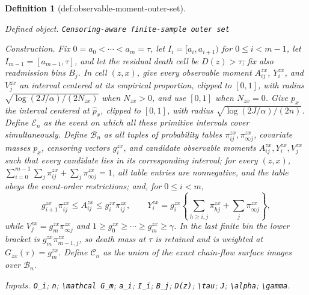 \documentclass{article}
\newtheorem{definition}{Definition}
\begin{document}
\begin{definition}[def:observable-moment-outer-set]\label{def:observable-moment-outer-set}
\par\smallskip\noindent\emph{Defined object.} \texttt{Censoring-\allowbreak{}aware finite-\allowbreak{}sample outer set}
\par\smallskip\noindent\emph{Construction.} Fix \(0=a_0<\cdots<a_m=\tau\), let \(I_i=[a_i,a_{i+1})\) for \(0\leq i<m-1\), let \(I_{m-1}=[a_{m-1},\tau]\), and let the residual death cell be \(D(z)>\tau\); fix also readmission bins \(B_j\).  In cell \((z,x)\), give every observable moment \(A^{zx}_{ij}\), \(Y^{zx}_i\), and \(V^{zx}_j\) an interval centered at its empirical proportion, clipped to \([0,1]\), with radius \(\sqrt{\log(2J/\alpha)/(2N_{zx})}\) when \(N_{zx}>0\), and use \([0,1]\) when \(N_{zx}=0\).  Give \(p_x\) the interval centered at \(\widehat p_x\), clipped to \([0,1]\), with radius \(\sqrt{\log(2J/\alpha)/(2n)}\).  Define \(\mathscr E_n\) as the event on which all these primitive intervals cover simultaneously.  Define \(\mathcal B_n\) as all tuples of probability tables \(\pi^{zx}_{ij},\pi^{zx}_{\infty j}\), covariate masses \(p_x\), censoring vectors \(g^{zx}_i\), and candidate observable moments \(A^{zx}_{ij},Y^{zx}_i,V^{zx}_j\) such that every candidate lies in its corresponding interval; for every \((z,x)\), \(\sum_{i=0}^{m-1}\sum_j\pi^{zx}_{ij}+\sum_j\pi^{zx}_{\infty j}=1\), all table entries are nonnegative, and the table obeys the event-order restrictions; and, for \(0\leq i<m\),
\[
g^{zx}_{i+1}\pi^{zx}_{ij}\leq A^{zx}_{ij}\leq g^{zx}_i\pi^{zx}_{ij},
\qquad
Y^{zx}_i=g^{zx}_i\left\{\sum_{h\geq i,j}\pi^{zx}_{hj}+\sum_j\pi^{zx}_{\infty j}\right\},
\]
while \(V^{zx}_j=g^{zx}_m\pi^{zx}_{\infty j}\) and \(1\geq g^{zx}_0\geq\cdots\geq g^{zx}_m\geq\gamma\).  In the last finite bin the lower bracket is \(g^{zx}_m\pi^{zx}_{m-1,j}\), so death mass at \(\tau\) is retained and is weighted at \(G_{zx}(\tau)=g^{zx}_m\).  Define \(\mathcal C_n\) as the union of the exact chain-flow surface images over \(\mathcal B_n\).
\par\smallskip\noindent\emph{Inputs.} \texttt{O\_\allowbreak{}i}; \texttt{n}; \texttt{\textbackslash{}\allowbreak{}mathcal G\_\allowbreak{}m}; \texttt{a\_\allowbreak{}i}; \texttt{I\_\allowbreak{}i}; \texttt{B\_\allowbreak{}j}; \texttt{D(z)}; \texttt{\textbackslash{}\allowbreak{}tau}; \texttt{J}; \texttt{\textbackslash{}\allowbreak{}alpha}; \texttt{\textbackslash{}\allowbreak{}gamma}.
\end{definition}
\end{document}
